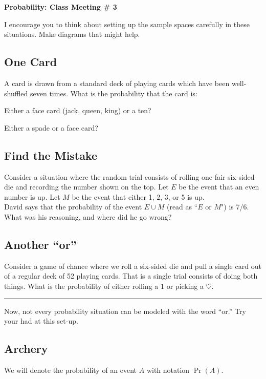 \documentclass[12pt]{amsart}
\theoremstyle{definition}
\begin{document}
\begin{center}
\textbf{\Huge
Probability: Class Meeting \# 3
}
\end{center}
\vspace{.5in}

I encourage you to think about setting up the sample spaces carefully in these situations.
Make diagrams that might help.

\subsection*{One Card} 
A card is drawn from a standard deck of playing cards which have been well-shuffled seven times. 
What is the probability that the card is:
\begin{compactitem}
\item Either a face card (jack, queen, king) or a ten?
\item Either a spade or a face card?\\
\end{compactitem}

\subsection*{Find the Mistake} 
Consider a situation where the random trial consists of rolling one fair six-sided die and recording the number shown on the top. 
Let $E$ be the event that an even number is up. Let $M$ be the event that either 1, 2, 3, or 5 is up.\\

David says that the probability of the event $E \cup M$ (read as ``$E$ or $M$") is 7/6. What was his reasoning, and where did he go wrong?

\subsection*{Another ``or''}
Consider a game of chance where we roll a six-sided die and pull a single card out of a regular deck of 52 playing cards.
That is a single trial consists of doing both things.
What is the probability of either rolling a $1$ or picking a $\heartsuit$.

\vspace{.5in}
\hrule
\vspace{.25in}

Now, not every probability situation can be modeled with the word ``or.''
Try your had at this set-up.

\subsection*{Archery}
We will denote the probability of an event $A$ with notation $\Pr(A)$.
\end{document}

